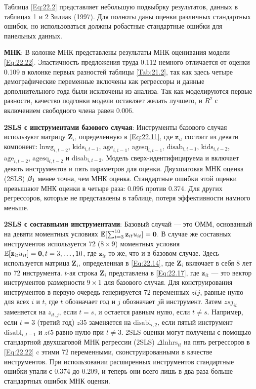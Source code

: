 Таблица \ref{Eq:22.2} представляет небольшую подвыбрку результатов, данных в таблицах 1 и 2 Зилиак (1997). Для полноты даны оценки различных стандартных ошибок, но использоваться должны робастные стандартные ошибки для панельных данных.

\textbf{МНК}: В колонке МНК представлены результаты МНК оценивания модели \ref{Eq:22.22}. Эластичность предложения труда 0.112 немного отличается от оценки 0.109 в колонке первых разностей таблицы \ref{Tab:21.2}, так как здесь четыре демографические переменные включены как регрессоры и данные дополнительного года были исключены из анализа. Так как моделируются первые разности, качество подгонки модели оставляет желать лучшего, и $R^2$ с включением свободного члена равен  0.006.

\textbf{2SLS  с инструментами базового случая}: Инструменты базового случая используют матрицу $\mathbf Z_i$, определенную в \ref{Eq:22.11}, где $\mathbf z_{it}$ состоит из девяти компонент: $\mathrm{lnwg}_{i,t-2}$, $\mathrm{kids}_{i,t-1}$, $\mathrm{age}_{i,t-1}$, $\mathrm{agesq}_{i,t-1}$, $\mathrm{disab}_{i,t-1}$, $\mathrm{kids}_{i,t-2}$, $\mathrm{age}_{i,t-2}$, $\mathrm{agesq}_{i,t-2}$ и $\mathrm{disab}_{i,t-2}$. Модель сверх-идентифицируема и включает девять инструментов  и пять параметров для оценки. Двухшаговая МНК оценка (2SLS) $\bm{\beta}_1$ менее точна, чем МНК оценка. Стандартные ошибки этой оценки превышают МНК оценки в четыре раза: 0.096 против 0.374. Для других регрессоров, которые не представлены в таблице, потеря эффективности намного меньше.

\textbf{2SLS  с составными инструментами}: Базовый случай --- это ОММ, основанный на девяти моментных условиях $\mathbb{E}[\sum^{10}_{t=3} \mathbf z_{it} u_{it}]=\mathbf 0$. В случае же составных инструментов используется 72 ($8 \times 9$) моментных условия $\mathbb{E}[\mathbf z_{it} u_{it}]=\mathbf 0, t=3,\dots,10$, где $\mathbf z_{it}$ то же, что и в базовом случае. Здесь используется матрица $\mathbf Z_i$, определенная в \ref{Eq:22.14}, где $\mathbf Z_i$ включает в себя 8 лет по 72 инструмента. $t$-ая строка $\mathbf Z_i$ представлена в \ref{Eq:22.17}, где $\mathbf z_{it}$ --- это вектор инструментов размерности $9 \times 1$ для базового случая. Для конструирования инструментов в первую очередь генерируется 72 переменных $ztj$, равные нулю для всех $i$ и $t$, где $t$ обозначает год и $j$ обозначает $j$й инструмент. Затем $ z sj_{it}$ заменяется на $ z_{it,j}$, если $t=s$, и остается равным нулю, если $t \neq s$. Например, если $t=3$ (третий год) $ z 35$ заменяется на $\mathrm{disabl}_{i,2}$, если пятый инструмент $\mathrm{disabl}_{i,t-1}$ и $ z t5$ равно нулю при $t \neq 3$. 2SLS оценки могут получены с помощью стандартной двухшаговой МНК регрессии (2SLS) $\Delta \mathrm{lnhrs}_{it}$ на пять регрессоров в \ref{Eq:22.22} c этими 72 переменными, сконструированными в качестве инструментов. При использовании расширенных инструментов стандартные ошибки упали с 0.374 до 0.209, и теперь они всего лишь в два раза больше стандартных ошибок МНК оценки.

